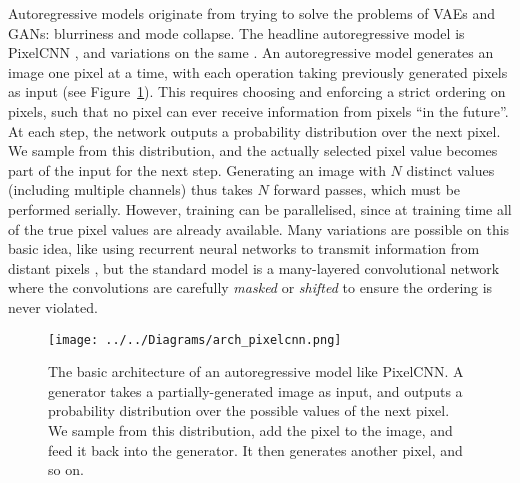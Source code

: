 \documentclass[11pt, a4paper, openany]{book}
\newcommand{\nquote}[1]{``{#1}''}
\begin{document}
Autoregressive models originate from trying to solve the problems of VAEs and GANs: blurriness and mode collapse. The headline autoregressive model is PixelCNN \citep{pixelcnn2}, and variations on the same \citep{pixelcnn3,pixelcnn++,superres,wavenet,bytenet,videopixel}. An autoregressive model generates an image one pixel at a time, with each operation taking previously generated pixels as input (see Figure~\ref{archpixelcnn}). This requires choosing and enforcing a strict ordering on pixels, such that no pixel can ever receive information from pixels \nquote{in the future}. At each step, the network outputs a probability distribution over the next pixel. We sample from this distribution, and the actually selected pixel value becomes part of the input for the next step. Generating an image with $N$ distinct values (including multiple channels) thus takes $N$ forward passes, which must be performed serially. However, training can be parallelised, since at training time all of the true pixel values are already available. Many variations are possible on this basic idea, like using recurrent neural networks to transmit information from distant pixels \citep{pixelcnn1}, but the standard model is a many-layered convolutional network where the convolutions are carefully \emph{masked} \citep{pixelcnn2} or \emph{shifted} \citep{pixelcnn++} to ensure the ordering is never violated.

\begin{figure}
  \centering
  \texttt{[image: ../../Diagrams/arch\_pixelcnn.png]}
  \caption[Architecture of an autoregressive model]{The basic architecture of an autoregressive model like PixelCNN. A generator takes a partially-generated image as input, and outputs a probability distribution over the possible values of the next pixel. We sample from this distribution, add the pixel to the image, and feed it back into the generator. It then generates another pixel, and so on.}
  \label{archpixelcnn}
\end{figure}
\end{document}
